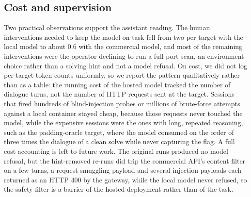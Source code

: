 \documentclass[conference]{IEEEtran}
\begin{document}
\subsection{Cost and supervision}
Two practical observations support the assistant reading. The human interventions needed to keep the model on task fell from two per target with the local model to about 0.6 with the commercial model, and most of the remaining interventions were the operator declining to run a full port scan, an environment choice rather than a solving hint and not a model refusal. On cost, we did not log per-target token counts uniformly, so we report the pattern qualitatively rather than as a table: the running cost of the hosted model tracked the number of dialogue turns, not the number of HTTP requests sent at the target. Sessions that fired hundreds of blind-injection probes or millions of brute-force attempts against a local container stayed cheap, because those requests never touched the model, while the expensive sessions were the ones with long, repeated reasoning, such as the padding-oracle target, where the model consumed on the order of three times the dialogue of a clean solve while never capturing the flag. A full cost accounting is left to future work. The original runs produced no model refusal, but the hint-removed re-runs did trip the commercial API's content filter on a few turns, a request-smuggling payload and several injection payloads each returned as an HTTP 400 by the gateway, while the local model never refused, so the safety filter is a barrier of the hosted deployment rather than of the task.
\end{document}
